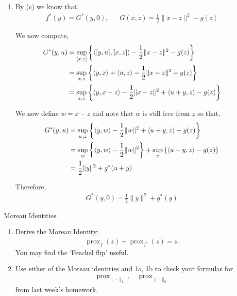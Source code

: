 \documentclass[10pt]{article}
\newcommand{\prox}{\operatorname{prox}}
\begin{document}
\begin{solution}[Solution]
\begin{enumerate}[label=(\alph*)]
    \item
        By (c) we know that,
        \begin{align*}
            f^*(y) = G^*(y,0) 
            ,&& G(x,z) = \frac{1}{2} \| x-z \|^2 + g(z)
        \end{align*}

        We now compute,
        \begin{align*}
            G^*(y,u) &= \sup_{[x,z]} \left\{ \left\langle [y,u],[x,z] \right\rangle - \frac{1}{2} \| x-z \|^2 - g(z)  \right\} 
            \\&= \sup_{x,z} \left\{ \left\langle y,x \right\rangle + \left\langle u,z \right\rangle - \frac{1}{2} \| x-z \|^2 - g(z)  \right\}
            \\&= \sup_{x,z} \left\{ \left\langle y,x-z \right\rangle - \frac{1}{2} \| x-z \|^2 + \left\langle u+y,z \right\rangle - g(z) \right\}
        \end{align*}
        

        We now define \( w = x-z \) and note that \( w \) is still free from \( z \) so that,
        \begin{align*}
            G^*(y,u) &= \sup_{w,z} \left\{ \left\langle y,w \right\rangle - \frac{1}{2} \| w \|^2 + \left\langle u+y,z \right\rangle - g(z) \right\} 
            \\&= \sup_w \left\{ \left\langle y,w \right\rangle - \frac{1}{2} \| w \|^2 \right\} 
            + \sup_z \left\{ \left\langle u+y,z \right\rangle - g(z) \right\}
            \\&= \frac{1}{2} \| y \|^2 + g^*(u+y)
        \end{align*}

        Therefore,
        \begin{align*}
            G^*(y,0) = \frac{1}{2} \| y \|^2 + g^*(y)
        \end{align*}
       
\end{enumerate}
\end{solution}


\begin{problem}[Problem 3]
Moreau Identities.
\begin{enumerate}[label=(\alph*),nolistsep]
\item  Derive the Moreau Identity: 
\begin{align*}
    \prox_{f}(z) + \prox_{f^*}(z) = z. 
\end{align*}
You may find the `Fenchel flip' useful. 
\item Use either of the Moreau identities and 
1a, 1b to check your formulas for 
\begin{align*}
    \prox_{\|\cdot\|_1}, \quad \prox_{\|\cdot\|_2}
\end{align*}
from last week's homework. 
\end{enumerate}
\end{problem}
\end{document}
